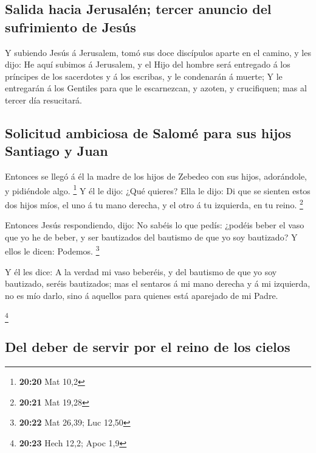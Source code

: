 \hypertarget{salida-hacia-jerusaluxe9n-tercer-anuncio-del-sufrimiento-de-jesuxfas}{%
\subsection{Salida hacia Jerusalén; tercer anuncio del sufrimiento de
Jesús}\label{salida-hacia-jerusaluxe9n-tercer-anuncio-del-sufrimiento-de-jesuxfas}}

 Y subiendo Jesús á Jerusalem, tomó sus doce discípulos
aparte en el camino, y les dijo:  He aquí subimos á
Jerusalem, y el Hijo del hombre será entregado á los príncipes de los
sacerdotes y á los escribas, y le condenarán á muerte;  Y
le entregarán á los Gentiles para que le escarnezcan, y azoten, y
crucifiquen; mas al tercer día resucitará.

\hypertarget{solicitud-ambiciosa-de-salomuxe9-para-sus-hijos-santiago-y-juan}{%
\subsection{Solicitud ambiciosa de Salomé para sus hijos Santiago y
Juan}\label{solicitud-ambiciosa-de-salomuxe9-para-sus-hijos-santiago-y-juan}}

 Entonces se llegó á él la madre de los hijos de Zebedeo
con sus hijos, adorándole, y pidiéndole algo. \footnote{\textbf{20:20}
  Mat 10,2}  Y él le dijo: ¿Qué quieres? Ella le dijo: Di
que se sienten estos dos hijos míos, el uno á tu mano derecha, y el otro
á tu izquierda, en tu reino. \footnote{\textbf{20:21} Mat 19,28}

 Entonces Jesús respondiendo, dijo: No sabéis lo que
pedís: ¿podéis beber el vaso que yo he de beber, y ser bautizados del
bautismo de que yo soy bautizado? Y ellos le dicen: Podemos. \footnote{\textbf{20:22}
  Mat 26,39; Luc 12,50}

 Y él les dice: A la verdad mi vaso beberéis, y del
bautismo de que yo soy bautizado, seréis bautizados; mas el sentaros á
mi mano derecha y á mi izquierda, no es mío darlo, sino á aquellos para
quienes está aparejado de mi Padre.

\footnote{\textbf{20:23} Hech 12,2; Apoc 1,9}

\hypertarget{del-deber-de-servir-por-el-reino-de-los-cielos}{%
\subsection{Del deber de servir por el reino de los
cielos}\label{del-deber-de-servir-por-el-reino-de-los-cielos}}

